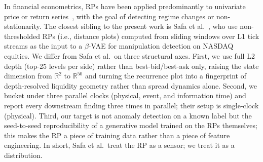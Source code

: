 In financial econometrics, RPs have been applied predominantly to
univariate price or return series~\cite{strozzi2002recurrence}, with
the goal of detecting regime changes or non-stationarity. The closest
sibling to the present work is Safa et al.~\cite{safa2024}, who use
non-thresholded RPs (i.e., distance plots) computed from sliding
windows over L1 tick streams as the input to a $\beta$-VAE for
manipulation detection on NASDAQ equities. We differ from Safa et al.\
on three structural axes. First, we use full L2 depth (top-25 levels
per side) rather than best-bid/best-ask only, raising the state
dimension from $\mathbb{R}^2$ to $\mathbb{R}^{50}$ and turning the
recurrence plot into a fingerprint of depth-resolved liquidity geometry
rather than spread dynamics alone. Second, we bucket under three
parallel clocks (physical, event, and information time) and report
every downstream finding three times in parallel; their setup is
single-clock (physical). Third, our target is not anomaly detection on
a known label but the seed-to-seed reproducibility of a generative
model trained on the RPs themselves; this makes the RP a piece of
training data rather than a piece of feature engineering. In short,
Safa et al.\ treat the RP as a sensor; we treat it as a distribution.
